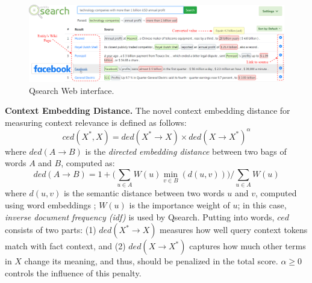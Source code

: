 
\begin{figure}[t]
\centering
\includegraphics[width=1\textwidth]{figures/new/gui.png}
\caption{Qsearch Web interface.}
\label{fig:gui}
\vspace{-1em}
\end{figure}

\noindent \textbf{Context Embedding Distance.}
The novel context embedding distance for measuring context relevance is defined as follows:
\[ced(X^*, X) = ded(X^* \rightarrow X) \times ded(X \rightarrow X^*)^\alpha\]
where $ded(A \rightarrow B)$ is the \textit{directed embedding distance} between two bags of words $A$ and $B$, computed as:
\[ded(A \rightarrow B) = 1 + \Bigg(\sum\limits_{u \in A} W(u)\min\limits_{v \in B}(d(u,v))\Bigg)\big/\sum\limits_{u \in A}W(u)\]
where $d(u,v)$ is the semantic distance between two words $u$ and $v$, computed using word embeddings 
 \cite{DBLP:conf/emnlp/PenningtonSM14}; $W(u)$ is the importance weight of $u$; in this case, \textit{inverse document frequency (idf)} is used by Qsearch.
Putting into words, $ced$ consists of two parts: (1) $ded(X^* \rightarrow X)$ measures how well query context tokens match with fact context, and (2) $ded(X \rightarrow X^*)$ captures how much other terms in $X$ change its meaning, and thus, should be penalized in the total score. $\alpha \geq 0$ controls the influence of this penalty.


